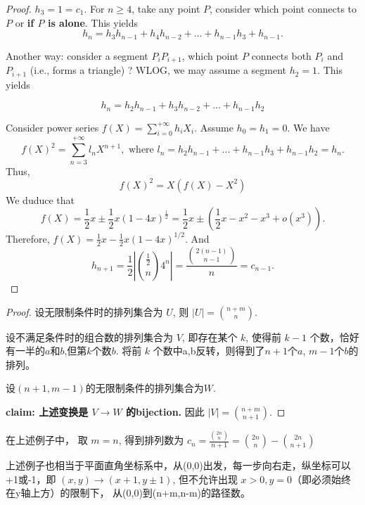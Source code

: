\documentclass[oneside]{book}
\begin{document}
\begin{proof}
    $h_3 = 1 = c_1$. For $n\ge 4$, take any point $P$, consider which point connects to $P$ or {\bf if $P$ is alone}. This yields
    \[
        h_n = h_3h_{n-1} + h_4 h_{n-2} + ... + h_{n-1}h_3 + h_{n-1}.
    \]

    Another way: consider a segment $P_iP_{i+1}$, which point $P$ connects both $P_i$ and $P_{i+1}$ (i.e., forms a triangle) ? 
    WLOG, we may assume a segment $h_2 = 1$. This yields

    \[
        h_n = h_2h_{n-1} + h_3h_{n-2} + ... + h_{n-1}h_2
    \]

    Consider power series $f(X) = \sum_{i = 0}^{+\infty} h_i X_i$. Assume $h_0 = h_1 = 0$. We have 
    \[
        f(X)^2 = \sum_{n = 3}^{+\infty} l_n X^{n+1}, \text{ where } l_n =  h_2h_{n-1}+...+h_{n-1}h_3 + h_{n-1}h_2 = h_n. 
    \]
    Thus, 
    \[
        f(X)^2 = X (f(X) - X^2)
    \]
    We duduce that 
    \[
        f(X) = \frac 1 2 x\pm \frac 1 2 x (1-4x)^{\frac 1 2} = \frac  1 2 x \pm (\frac 1 2 x - x^2 - x^3 + o(x^3)).
    \]
    Therefore, $f(X) = \frac 1 2 x - \frac 1 2 x(1-4x)^{1/2}$. And 
    \[
        h_{n+1} = \frac 1 2 \left| \binom{\frac 1 2}{n} 4^n\right| = \frac {\binom{2(n-1)}{n-1}} n = c_{n-1}.
    \]
\end{proof}

\begin{proof}
    设无限制条件时的排列集合为 $U$, 则 $|U| = \binom{n+m}{n}$. 

    设不满足条件时的组合数的排列集合为 $V$, 即存在某个 $k$, 使得前 $k-1$ 个数，恰好有一半的$a$和$b$,但第$k$个数$b$. 将前 $k$ 个数中a,b反转，则得到了$n+1$个$a$, $m-1$个$b$的排列。

    设$(n+1, m-1)$的无限制条件的排列集合为$W$. 

    {\bf claim: 上述变换是 $V \to W$ 的bijection.} 
    因此 $|V| = \binom{n+m}{n+1}$.
\end{proof}

\begin{remark}
    在上述例子中， 取 $m = n$, 得到排列数为 $c_n = \frac {\binom{2n}{n}} {n+1} = \binom{2n}{n} - \binom{2n}{n+1}$
\end{remark}
\begin{remark}
    上述例子也相当于平面直角坐标系中，从(0,0)出发，每一步向右走，纵坐标可以+1或-1，即 $(x,y) \to (x+1, y\pm 1)$, 但不允许出现 $x>0,y = 0$（即必须始终在y轴上方）的限制下， 从(0,0)到(n+m,n-m)的路径数。
\end{remark}
\end{document}
